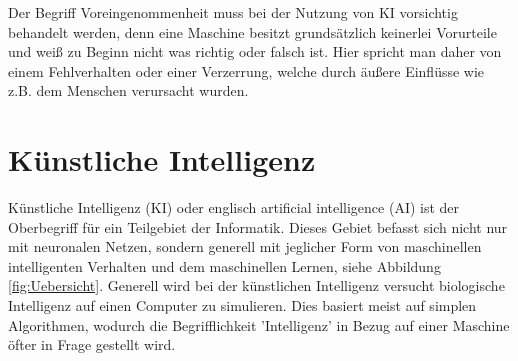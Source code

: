 \documentclass[12pt,oneside,a4paper,parskip]{scrbook}
\begin{document}
Der Begriff Voreingenommenheit muss bei der Nutzung von KI vorsichtig behandelt werden, denn eine Maschine besitzt grundsätzlich keinerlei Vorurteile und weiß zu Beginn nicht was richtig oder falsch ist. Hier spricht man daher von einem Fehlverhalten oder einer Verzerrung, welche durch äußere Einflüsse wie z.B. dem Menschen verursacht wurden.\\

\section{Künstliche Intelligenz}
Künstliche Intelligenz (KI) oder englisch artificial intelligence (AI) ist der Oberbegriff für ein Teilgebiet der Informatik. Dieses Gebiet befasst sich nicht nur mit neuronalen Netzen, sondern generell mit jeglicher Form von maschinellen intelligenten Verhalten und dem maschinellen Lernen, siehe Abbildung \ref{fig:Uebersicht}. Generell wird bei der künstlichen Intelligenz versucht biologische Intelligenz auf einen Computer zu simulieren. Dies basiert meist auf simplen Algorithmen, wodurch die Begrifflichkeit 'Intelligenz' in Bezug auf einer Maschine öfter in Frage gestellt wird.
\end{document}
